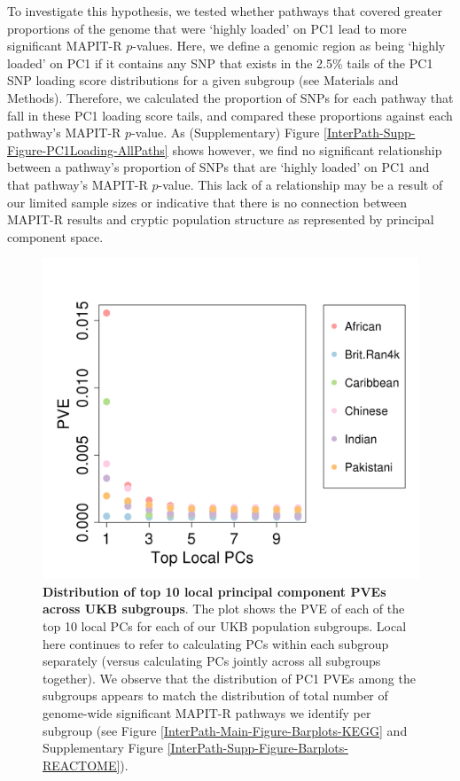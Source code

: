 \documentclass[10pt,a4paper]{article}
\begin{document}
To investigate this hypothesis, we tested whether pathways that covered greater proportions of the genome that were `highly loaded' on PC1 lead to more significant MAPIT-R $p$-values. Here, we define a genomic region as being `highly loaded' on PC1 if it contains any SNP that exists in the 2.5\% tails of the PC1 SNP loading score distributions for a given subgroup (see Materials and Methods). Therefore, we calculated the proportion of SNPs for each pathway that fall in these PC1 loading score tails, and compared these proportions against each pathway's MAPIT-R $p$-value. As (Supplementary) Figure \ref{InterPath-Supp-Figure-PC1Loading-AllPaths} shows however, we find no significant relationship between a pathway's proportion of SNPs that are `highly loaded' on PC1 and that pathway's MAPIT-R $p$-value. This lack of a relationship may be a result of our limited sample sizes or indicative that there is no connection between MAPIT-R results and cryptic population structure as represented by principal component space.

\begin{figure}[htb]
\centering
\includegraphics[scale=.45]{Images/Main/InterPath_Main_Figure_Eigenvalues_vs2.png}
\caption[TBD]{\textbf{Distribution of top 10 local principal component PVEs across UKB subgroups}. The plot shows the PVE of each of the top 10 local PCs for each of our UKB population subgroups. Local here continues to refer to calculating PCs within each subgroup separately (versus calculating PCs jointly across all subgroups together). We observe that the distribution of PC1 PVEs among the subgroups appears to match the distribution of total number of genome-wide significant MAPIT-R pathways we identify per subgroup (see Figure \ref{InterPath-Main-Figure-Barplots-KEGG} and  Supplementary Figure \ref{InterPath-Supp-Figure-Barplots-REACTOME}).}
\label{InterPath-Main-Figure-Eigenvalues}
\end{figure}
\end{document}
